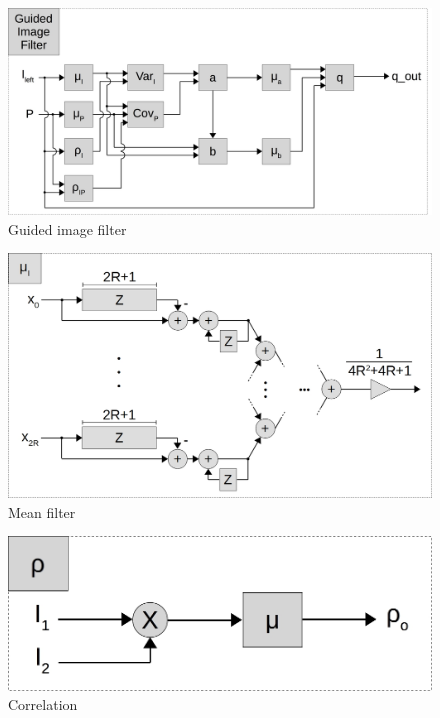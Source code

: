 \begin{figure}[ht!]
  \centering
  \includegraphics[scale=0.3]{figures/guided_image_filter}
  \caption{Guided image filter}
  \label{fig:Guided_image_filter}
\end{figure}

\begin{figure}[ht!]
  \centering
  \includegraphics[scale=0.3]{figures/mean}
  \caption{Mean filter}
  \label{fig:mean}
\end{figure}

\begin{figure}[ht!]
  \centering
  \includegraphics[scale=0.3]{figures/rho}
  \caption{Correlation}
  \label{fig:rho}
\end{figure}

